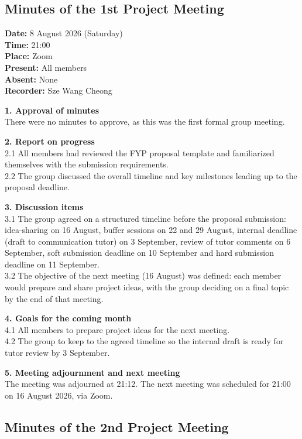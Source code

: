 
\subsection{Minutes of the 1st Project Meeting}

\textbf{Date:} 8 August 2026 (Saturday) \\
\textbf{Time:} 21:00 \\
\textbf{Place:} Zoom \\
\textbf{Present:} All members \\
\textbf{Absent:} None \\
\textbf{Recorder:} Sze Wang Cheong

\textbf{1. Approval of minutes} \\
There were no minutes to approve, as this was the first formal group meeting.

\textbf{2. Report on progress} \\
2.1 All members had reviewed the FYP proposal template and familiarized themselves with the submission requirements. \\
2.2 The group discussed the overall timeline and key milestones leading up to the proposal deadline.

\textbf{3. Discussion items} \\
3.1 The group agreed on a structured timeline before the proposal submission: idea-sharing on 16 August, buffer sessions on 22 and 29 August, internal deadline (draft to communication tutor) on 3 September, review of tutor comments on 6 September, soft submission deadline on 10 September and hard submission deadline on 11 September. \\
3.2 The objective of the next meeting (16 August) was defined: each member would prepare and share project ideas, with the group deciding on a final topic by the end of that meeting.

\textbf{4. Goals for the coming month} \\
4.1 All members to prepare project ideas for the next meeting. \\
4.2 The group to keep to the agreed timeline so the internal draft is ready for tutor review by 3 September.

\textbf{5. Meeting adjournment and next meeting} \\
The meeting was adjourned at 21:12. The next meeting was scheduled for 21:00 on 16 August 2026, via Zoom.

\clearpage
\subsection{Minutes of the 2nd Project Meeting}

